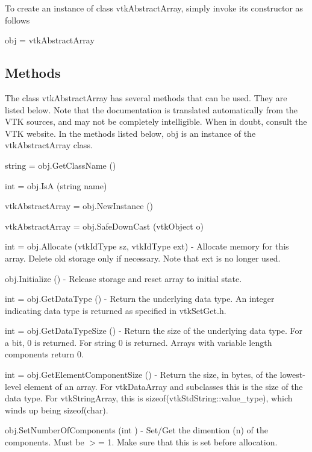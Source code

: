 To create an instance of class vtk\-Abstract\-Array, simply invoke its constructor as follows \begin{DoxyVerb}  obj = vtkAbstractArray
\end{DoxyVerb}
 \hypertarget{vtkwidgets_vtkxyplotwidget_Methods}{}\subsection{Methods}\label{vtkwidgets_vtkxyplotwidget_Methods}
The class vtk\-Abstract\-Array has several methods that can be used. They are listed below. Note that the documentation is translated automatically from the V\-T\-K sources, and may not be completely intelligible. When in doubt, consult the V\-T\-K website. In the methods listed below, {\ttfamily obj} is an instance of the vtk\-Abstract\-Array class. 
\begin{DoxyItemize}
\item {\ttfamily string = obj.\-Get\-Class\-Name ()}  
\item {\ttfamily int = obj.\-Is\-A (string name)}  
\item {\ttfamily vtk\-Abstract\-Array = obj.\-New\-Instance ()}  
\item {\ttfamily vtk\-Abstract\-Array = obj.\-Safe\-Down\-Cast (vtk\-Object o)}  
\item {\ttfamily int = obj.\-Allocate (vtk\-Id\-Type sz, vtk\-Id\-Type ext)} -\/ Allocate memory for this array. Delete old storage only if necessary. Note that ext is no longer used.  
\item {\ttfamily obj.\-Initialize ()} -\/ Release storage and reset array to initial state.  
\item {\ttfamily int = obj.\-Get\-Data\-Type ()} -\/ Return the underlying data type. An integer indicating data type is returned as specified in vtk\-Set\-Get.\-h.  
\item {\ttfamily int = obj.\-Get\-Data\-Type\-Size ()} -\/ Return the size of the underlying data type. For a bit, 0 is returned. For string 0 is returned. Arrays with variable length components return 0.  
\item {\ttfamily int = obj.\-Get\-Element\-Component\-Size ()} -\/ Return the size, in bytes, of the lowest-\/level element of an array. For vtk\-Data\-Array and subclasses this is the size of the data type. For vtk\-String\-Array, this is sizeof(vtk\-Std\-String\-::value\-\_\-type), which winds up being sizeof(char).  
\item {\ttfamily obj.\-Set\-Number\-Of\-Components (int )} -\/ Set/\-Get the dimention (n) of the components. Must be $>$= 1. Make sure that this is set before allocation.  

\end{DoxyItemize}
